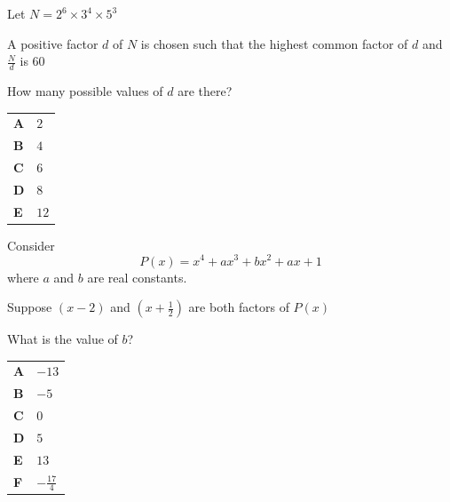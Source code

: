 \documentclass[11pt,a4paper]{article}
\begin{document}
\clearpage
\thispagestyle{djspaper}
\vspace*{8pt}
\begin{enumerate}[label=\textbf{\arabic*.},leftmargin=*,itemsep=0pt,start=15]
\questionitem[Number]
Let $N=2^6\times3^4\times5^3$

A positive factor $d$ of $N$ is chosen such that the highest common factor of $d$ and $\frac{N}{d}$ is $60$

How many possible values of $d$ are there?

\par\vspace*{12pt}
\begin{tabularx}{\linewidth}{@{}>{\bfseries}l Y@{}}
A &
$2$
\\[0.8em]
B &
$4$
\\[0.8em]
C &
$6$
\\[0.8em]
D &
$8$
\\[0.8em]
E &
$12$
\\
\end{tabularx}
\end{enumerate}
\clearpage
\thispagestyle{djspaper}
\vspace*{8pt}
\begin{enumerate}[label=\textbf{\arabic*.},leftmargin=*,itemsep=0pt,start=16]
\questionitem[Polynomials]
Consider
\[P(x)=x^4+ax^3+bx^2+ax+1\]
where $a$ and $b$ are real constants.

Suppose $(x-2)$ and $\left(x+\frac{1}{2}\right)$ are both factors of $P(x)$

What is the value of $b$?

\par\vspace*{12pt}
\begin{tabularx}{\linewidth}{@{}>{\bfseries}l Y@{}}
A &
$-13$
\\[0.8em]
B &
$-5$
\\[0.8em]
C &
$0$
\\[0.8em]
D &
$5$
\\[0.8em]
E &
$13$
\\[0.8em]
F &
$-\frac{17}{4}$
\\
\end{tabularx}
\end{enumerate}
\end{document}
